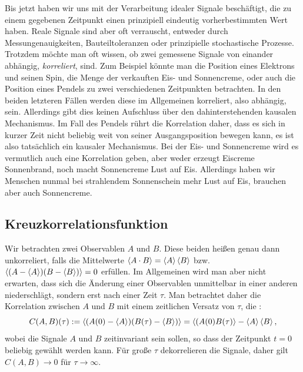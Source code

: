 Bis jetzt haben wir uns mit der Verarbeitung idealer Signale
beschäftigt, die zu einem gegebenen Zeitpunkt einen prinzipiell
eindeutig vorherbestimmten Wert haben.  Reale Signale sind aber oft
verrauscht, entweder durch Messungenauigkeiten, Bauteiltoleranzen oder
prinzipielle stochastische Prozesse.  Trotzdem möchte man oft wissen,
ob zwei gemessene Signale von einander abhängig, \emph{korreliert},
sind. Zum Beispiel könnte man die Position eines Elektrons und seinen
Spin, die Menge der verkauften Eis- und Sonnencreme, oder auch die
Position eines Pendels zu zwei verschiedenen Zeitpunkten betrachten.
In den beiden letzteren Fällen werden diese im Allgemeinen korreliert,
also abhängig, sein. Allerdings gibt dies keinen Aufschluss über den
dahinterstehenden kausalen Mechanismus. Im Fall des Pendels rührt die
Korrelation daher, dass es sich in kurzer Zeit nicht beliebig weit von
seiner Ausgangsposition bewegen kann, es ist also tatsächlich ein kausaler
Mechanismus. Bei der Eis- und Sonnencreme wird es vermutlich auch eine
Korrelation geben, aber weder erzeugt Eiscreme Sonnenbrand, noch macht
Sonnencreme Lust auf Eis. Allerdings haben wir Menschen nunmal bei
strahlendem Sonnenschein mehr Lust auf Eis, brauchen aber auch Sonnencreme.

\subsection{Kreuzkorrelationsfunktion}

Wir betrachten zwei Observablen $A$ und $B$. Diese
beiden heißen genau dann unkorreliert, falls die Mittelwerte
$\left\langle{A\cdot B}\right\rangle = \left\langle{A}\right\rangle\left\langle{B}\right\rangle$
bzw. $\left\langle{(A-\left\langle{A}\right\rangle)(B-\left\langle{B}\right\rangle)}\right\rangle=0$ erfüllen.  Im Allgemeinen
wird man aber nicht erwarten, dass sich die Änderung einer
Observablen unmittelbar in einer anderen niederschlägt, sondern erst
nach einer Zeit $\tau$.  Man betrachtet daher die Korrelation zwischen
$A$ und $B$ mit einem zeitlichen Versatz von $\tau$, die
\emph{}:
\begin{equation}
  \label{eq:crosscorr}
  C(A,B)(\tau) := \left\langle{(A(0)-\left\langle{A}\right\rangle)(B(\tau)-\left\langle{B}\right\rangle)}\right\rangle =
      \left\langle{(A(0)B(\tau)}\right\rangle-\left\langle{A}\right\rangle\left\langle{B}\right\rangle,
\end{equation}
wobei die Signale $A$ und $B$ zeitinvariant sein sollen, so dass der
Zeitpunkt $t=0$ beliebig gewählt werden kann. Für große $\tau$
dekorrelieren die Signale, daher gilt $C(A,B)\to 0$ für
$\tau\to\infty$.

